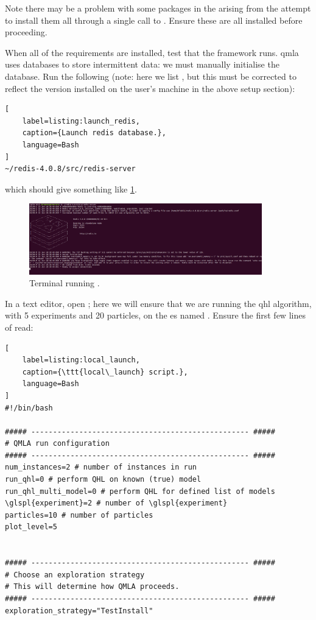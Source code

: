 Note there may be a problem with some packages in the  arising from the attempt to install them all through
a single call to . 
Ensure these are all installed before proceeding. 
\par 

When all of the requirements are installed, test that the framework runs. 
\gls{qmla} uses  databases to store intermittent data:
    we must manually initialise the database. 
Run the following 
    (note: here we list , but this must be corrected to reflect the 
    version installed on the user's machine in the above setup section):
\begin{lstlisting}[
    label=listing:launch_redis,
    caption={Launch redis database.},
    language=Bash
]
~/redis-4.0.8/src/redis-server
\end{lstlisting}

which should give something like \cref{fig:terminal_redis}.
\begin{figure}[h!]
    \begin{center}
        \includegraphics[width=0.9\textwidth]{appendix/figures/terminal_redis.png}
    \end{center}
    \caption[Terminal running redis-server]{Terminal running .}
    \label{fig:terminal_redis}
\end{figure}
\par 

In a text editor, open ; 
    here we will ensure that we are running the \gls{qhl} algorithm, 
    with 5 \glspl{experiment} and 20 particles, on the \gls{es} named .
Ensure the first few lines of  read:

\begin{lstlisting}[
    label=listing:local_launch,
    caption={\ttt{local\_launch} script.},
    language=Bash
]
#!/bin/bash

##### -------------------------------------------------- #####
# QMLA run configuration
##### -------------------------------------------------- #####
num_instances=2 # number of instances in run
run_qhl=0 # perform QHL on known (true) model
run_qhl_multi_model=0 # perform QHL for defined list of models
\glspl{experiment}=2 # number of \glspl{experiment}
particles=10 # number of particles
plot_level=5


##### -------------------------------------------------- #####
# Choose an exploration strategy 
# This will determine how QMLA proceeds. 
##### -------------------------------------------------- #####
exploration_strategy="TestInstall"
\end{lstlisting}    

